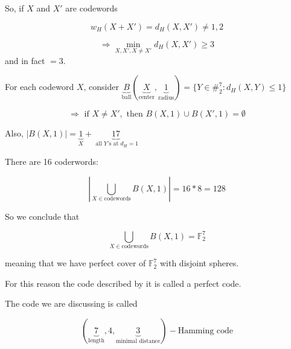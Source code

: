 \documentclass[twoside]{article}
\newtheorem{observation}{Observation}[section]
\theoremstyle{definition} %
\newtheorem{example}{Example}
\def\F{\mathbb{F}}
\begin{document}
So, if $X$ and $X'$ are codewords

\[
  w_H(X+X') = d_H(X, X') \neq 1,2
\]

\[
  \Rightarrow \min_{X, X', X \neq X'} d_H(X, X') \geq 3
\]
and in fact $ = 3$.

For each codeword $X$, consider $\underbrace{B}_{\text{ball}}(\underbrace{X}_{\text{center}}, \underbrace{1}_{\text{radius}}) = \{Y \in \#^7_2 : d_H(X, Y) \leq 1 \}$

\[
  \Rightarrow \text{ if } X \neq X', \text{ then } B(X, 1) \cup B(X', 1) = \emptyset
\]

Also, $|B(X, 1)| = \underbrace{1}_{X} + \underbrace{17}_{\text{ all } Y \text{'s at } d_H = 1}$

There are 16 coderwords:

\[
  | \bigcup_{X \in \text{codewords}} B(X, 1) | = 16 * 8 = 128
\]

So we conclude that

\[
  \bigcup_{X \in \text{codewords}} B(X, 1) = \F_2^7
\]

meaning that we have perfect cover of $\F_2^7$ with disjoint spheres.

For this reason the code described by it is called a perfect code.

The code we are discussing is called

\[
  (\underbrace{7}_{\text{length}}, 4, \underbrace{3}_{\text{minimal distance}})-\text{Hamming code}
\]






\end{document}
